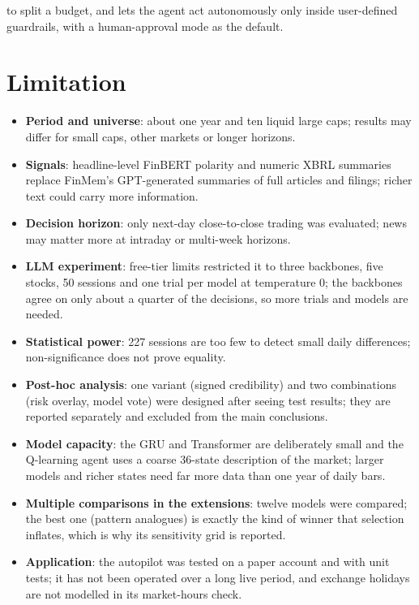 to split a budget, and lets the agent act autonomously only inside user-defined guardrails, with a human-approval mode as the default.

\section{Limitation}
\begin{itemize}
  \item \textbf{Period and universe}: about one year and ten liquid large caps; results may differ for small caps, other markets or longer horizons.
  \item \textbf{Signals}: headline-level FinBERT polarity and numeric XBRL summaries replace FinMem's GPT-generated summaries of full articles and filings; richer text could carry more information.
  \item \textbf{Decision horizon}: only next-day close-to-close trading was evaluated; news may matter more at intraday or multi-week horizons.
  \item \textbf{LLM experiment}: free-tier limits restricted it to three backbones, five stocks, 50 sessions and one trial per model at temperature 0; the backbones agree on only about a quarter of the decisions, so more trials and models are needed.
  \item \textbf{Statistical power}: 227 sessions are too few to detect small daily differences; non-significance does not prove equality.
  \item \textbf{Post-hoc analysis}: one variant (signed credibility) and two combinations (risk overlay, model vote) were designed after seeing test results; they are reported separately and excluded from the main conclusions.
  \item \textbf{Model capacity}: the GRU and Transformer are deliberately small and the Q-learning agent uses a coarse 36-state description of the market; larger models and richer states need far more data than one year of daily bars.
  \item \textbf{Multiple comparisons in the extensions}: twelve models were compared; the best one (pattern analogues) is exactly the kind of winner that selection inflates, which is why its sensitivity grid is reported.
  \item \textbf{Application}: the autopilot was tested on a paper account and with unit tests; it has not been operated over a long live period, and exchange holidays are not modelled in its market-hours check.
\end{itemize}

